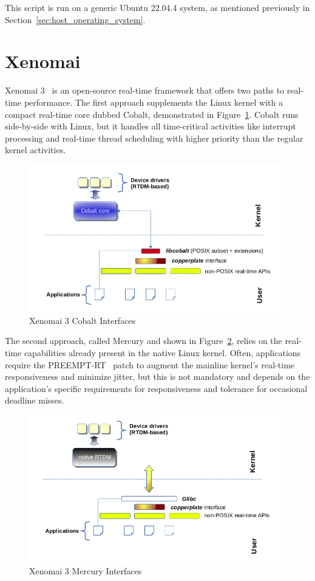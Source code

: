 \documentclass[MMR,Master,english]{twbook}
\begin{document}
\noindent This script is run on a generic Ubuntu 22.04.4 system, as mentioned previously in Section~\ref{sec:host_operating_system}.

\clearpage

\section{Xenomai}\label{sec:xenomai}

Xenomai 3~\cite{XenomaiXenomai} is an open-source real-time framework that offers two paths to real-time performance. The first approach supplements the Linux kernel with a compact real-time core dubbed Cobalt, demonstrated in Figure~\ref{fig:cobalt}. Cobalt runs side-by-side with Linux, but it handles all time-critical activities like interrupt processing and real-time thread scheduling with higher priority than the regular kernel activities.

\begin{figure}[H]
	\centering
	\includegraphics[width=0.6\columnwidth]{img/introduction/xenomai/x3-cobalt-interfaces.png}
	\caption[Xenomai 3 Cobalt Interfaces]{Xenomai 3 Cobalt Interfaces~\cite{OverviewXenomai}}
	\label{fig:cobalt}
\end{figure}

\noindent  The second approach, called Mercury and shown in Figure~\ref{fig:mercury}, relies on the real-time capabilities already present in the native Linux kernel. Often, applications require the PREEMPT-RT~\cite{RealtimePreempt_rt_versionsWiki} patch to augment the mainline kernel's real-time responsiveness and minimize jitter, but this is not mandatory and depends on the application's specific requirements for responsiveness and tolerance for occasional deadline misses.

\begin{figure}[H]
	\centering
	\includegraphics[width=0.6\columnwidth]{img/introduction/xenomai/x3-mercury-interfaces.png}
	\caption[Xenomai 3 Mercury Interfaces]{Xenomai 3 Mercury Interfaces~\cite{OverviewXenomai}}
	\label{fig:mercury}
\end{figure}
\end{document}
